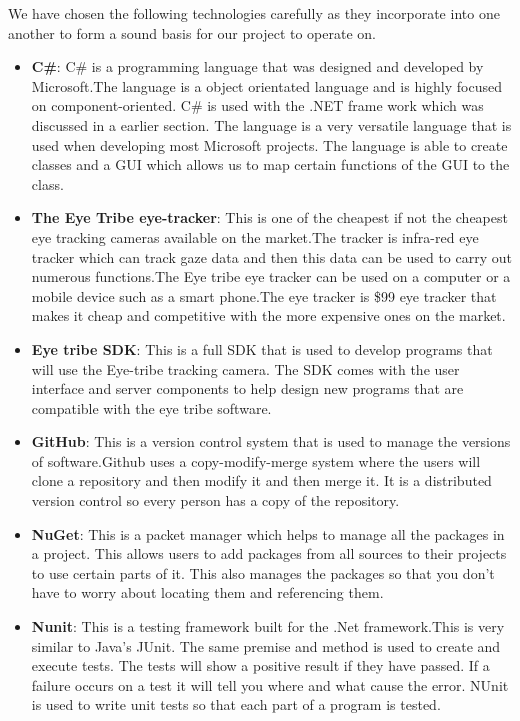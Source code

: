 We have chosen the following technologies carefully as they incorporate into one another to form a sound basis for our project to operate on.

\begin{itemize}
	\item \textbf{C\#}:	C\# is a programming language that was designed and developed by Microsoft.The language is a object orientated language and is highly focused on component-oriented. C\# is used with the .NET frame work which was discussed in a earlier section. The language is a very versatile language that is used when developing most Microsoft projects. The language is able to create classes and a GUI which allows us to map certain functions of the GUI to the class.
	
	\item \textbf{The Eye Tribe eye-tracker}: This is one of the cheapest if not the cheapest eye tracking cameras available on the market.The tracker is infra-red eye tracker which can track gaze data and then this data can be used to carry out numerous functions.The Eye tribe eye tracker can be used on a computer or a mobile device such as a smart phone.The eye tracker is \$99 eye tracker that makes it cheap and competitive with the more expensive ones on the market.
	
	\item \textbf{Eye tribe SDK}: This is a full SDK that is used to develop programs that will use the Eye-tribe tracking camera. The SDK comes with the user interface and server components to help design new programs that are compatible with the eye tribe software.
	
	\item \textbf{GitHub}: This is a version control system that is used to manage the versions of software.Github uses a copy-modify-merge system where the users will clone a repository and then modify it and then merge it. It is a distributed version control so every person has a copy of the repository.
		\item \textbf{NuGet}: This is a packet manager which helps to manage all the packages in a project. This allows users to add packages from all sources to their projects to use certain parts of it. This also manages the packages so that you don't have to worry about locating them and referencing them.
		\item \textbf{Nunit}: This is a testing framework built for the .Net framework.This is very similar to Java's JUnit. The same premise and method is used to create and execute tests. The tests will show a positive result if they have passed. If a failure occurs on a test it will tell you where and what cause the error.  NUnit is used to write unit tests so that each part of a program is tested.
		

\end{itemize}
